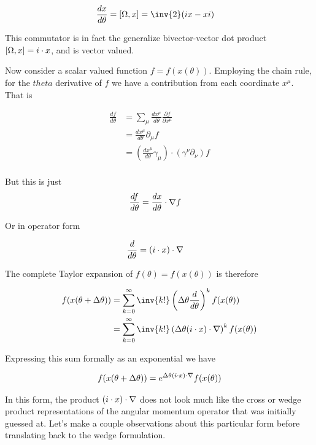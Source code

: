 \begin{align}\label{eqn:rotationGen:foo12}
\frac{dx}{d\theta} &= \antisymmetric{\Omega}{x} = \inv{2} (i x - x i)
\end{align}

This commutator is in fact the generalize bivector-vector dot product $\left[{\Omega},{x}\right] = i \cdot x$, and is vector valued.

Now consider a scalar valued function $f = f(x(\theta))$.  Employing the chain rule, for the $theta$ derivative of $f$ we have a contribution from each coordinate $x^\mu$.  That is

\begin{align*}
\frac{df}{d\theta} 
&= \sum_\mu \frac{d x^\mu}{d \theta} \frac{\partial f}{\partial x^\mu}  \\
&= \frac{d x^\mu}{d \theta} \partial_\mu f \\
&= \left( \frac{d x^\mu}{d \theta} \gamma_\mu \right) \cdot \left( \gamma^\nu \partial_\nu \right)  f \\
\end{align*}

But this is just
\begin{align}\label{eqn:rotationGen:foo13}
\frac{df}{d\theta} &= \frac{d x}{d \theta} \cdot \nabla f
\end{align}

Or in operator form

\begin{align}\label{eqn:rotationGen:foo14}
\frac{d}{d\theta} &= (i \cdot x) \cdot \nabla 
\end{align}

The complete Taylor expansion of $f(\theta) = f(x(\theta))$ is therefore 

\begin{align*}
f(x(\theta + \Delta\theta))
&=
\sum_{k=0}^\infty \inv{k!} \left( \Delta\theta \frac{d}{d\theta} \right)^k 
f(x(\theta)) \\
&=
\sum_{k=0}^\infty \inv{k!} \left( \Delta\theta (i \cdot x) \cdot \grad \right)^k 
f(x(\theta))
\end{align*}

Expressing this sum formally as an exponential we have

\begin{align}\label{eqn:rotationGen:foo20}
f(x(\theta + \Delta\theta)) = e^{\Delta\theta ( i \cdot x) \cdot \nabla} f(x(\theta))
\end{align}

In this form, the product $(i \cdot x) \cdot \nabla$ does not look much like the cross or wedge product representations of the angular momentum operator that was initially guessed at.  Let's make a couple observations about this particular form before translating back to the wedge formulation.

